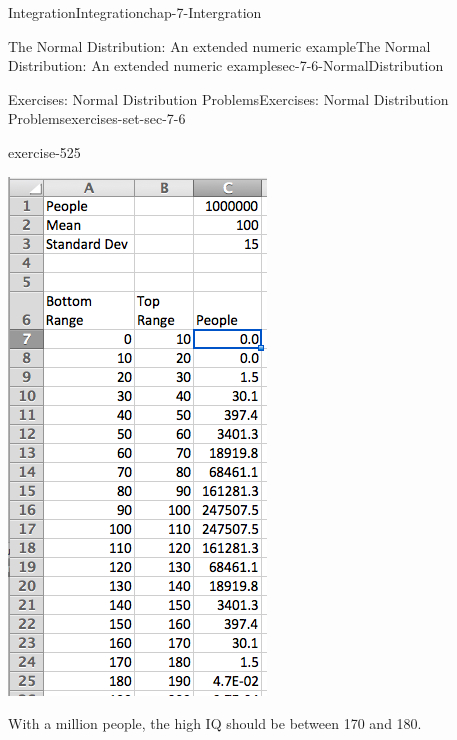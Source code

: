 \documentclass[oneside,10pt,]{book}
\numberwithin{equation}{section}
\begin{document}
\begin{chapterptx}{Integration}{}{Integration}{}{}{chap-7-Intergration}
\begin{sectionptx}{The Normal Distribution: An extended numeric example}{}{The Normal Distribution: An extended numeric example}{}{}{sec-7-6-NormalDistribution}
\begin{exercises-subsection-numberless}{Exercises: Normal Distribution Problems}{}{Exercises: Normal Distribution Problems}{}{}{exercises-set-sec-7-6}
\begin{divisionexercise}{9}{}{}{exercise-525}
\begin{sidebyside}{1}{0.3}{0.3}{0}
\begin{sbspanel}{0.4}
\includegraphics[width=1\linewidth]{images/sec7-6-sol9b.png}
\end{sbspanel}%
\end{sidebyside}%
\par
\hypertarget{p-2994}{}%
With a million people, the high IQ should be between 170 and 180.%

\end{divisionexercise}
\end{exercises-subsection-numberless}
\end{sectionptx}
\end{chapterptx}
\end{document}
